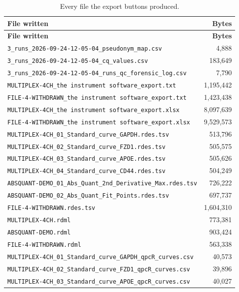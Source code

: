 {\small
\begin{xltabular}{\linewidth}{|X|r|}
\caption{Every file the export buttons produced.}\label{tab:val-exports} \\
\toprule \textbf{File written} & \textbf{Bytes} \\\midrule\endfirsthead
\toprule \textbf{File written} & \textbf{Bytes} \\\midrule\endhead
\texttt{3\_runs\_2026-09-24-12-05-04\_pseudonym\_map.csv} & 4,888 \\
\texttt{3\_runs\_2026-09-24-12-05-04\_cq\_values.csv} & 183,649 \\
\texttt{3\_runs\_2026-09-24-12-05-04\_runs\_qc\_forensic\_log.csv} & 7,790 \\
\texttt{MULTIPLEX-4CH\_the instrument software\_export.txt} & 1,195,442 \\
\texttt{FILE-4-WITHDRAWN\_the instrument software\_export.txt} & 1,423,438 \\
\texttt{MULTIPLEX-4CH\_the instrument software\_export.xlsx} & 8,097,639 \\
\texttt{FILE-4-WITHDRAWN\_the instrument software\_export.xlsx} & 9,529,573 \\
\texttt{MULTIPLEX-4CH\_01\_Standard\_curve\_GAPDH.rdes.tsv} & 513,796 \\
\texttt{MULTIPLEX-4CH\_02\_Standard\_curve\_FZD1.rdes.tsv} & 505,575 \\
\texttt{MULTIPLEX-4CH\_03\_Standard\_curve\_APOE.rdes.tsv} & 505,626 \\
\texttt{MULTIPLEX-4CH\_04\_Standard\_curve\_CD44.rdes.tsv} & 504,249 \\
\texttt{ABSQUANT-DEMO\_01\_Abs\_Quant\_2nd\_Derivative\_Max.rdes.tsv} & 726,222 \\
\texttt{ABSQUANT-DEMO\_02\_Abs\_Quant\_Fit\_Points.rdes.tsv} & 697,737 \\
\texttt{FILE-4-WITHDRAWN.rdes.tsv} & 1,604,310 \\
\texttt{MULTIPLEX-4CH.rdml} & 773,381 \\
\texttt{ABSQUANT-DEMO.rdml} & 903,424 \\
\texttt{FILE-4-WITHDRAWN.rdml} & 563,338 \\
\texttt{MULTIPLEX-4CH\_01\_Standard\_curve\_GAPDH\_qpcR\_curves.csv} & 40,573 \\
\texttt{MULTIPLEX-4CH\_02\_Standard\_curve\_FZD1\_qpcR\_curves.csv} & 39,896 \\
\texttt{MULTIPLEX-4CH\_03\_Standard\_curve\_APOE\_qpcR\_curves.csv} & 40,027 \\

\end{xltabular}}
